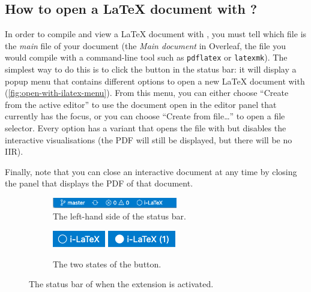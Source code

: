 \subsection{How to open a \LaTeX{} document with \iLaTeX{}?}
In order to compile and view a \LaTeX{} document with \iLaTeX{}, you must tell \iLaTeX{} which file is the \emph{main} file of your document (\ie the \emph{Main document} in Overleaf, the file you would compile with a command-line tool such as \texttt{pdflatex} or \texttt{latexmk}).
The simplest way to do this is to click the \iLaTeX{} button in the status bar: it will display a popup menu that contains different options to open a new \LaTeX{} document with \iLaTeX{} (\autoref{fig:open-with-ilatex-menu}).
From this menu, you can either choose ``Create from the active editor'' to use the document open in the editor panel that currently has the focus, or you can choose ``Create from file\dots'' to open a file selector.
Every option has a variant that opens the file with \iLaTeX{} but disables the interactive visualisations (the PDF will still be displayed, but there will be no IIR).

Finally, note that you can close an interactive document at any time by closing the panel that displays the PDF of that document.

\begin{figure}[h]
    \centering
    \begin{subfigure}[b]{0.6\textwidth}
        \centering
        \includegraphics[width=0.6\textwidth]{img/vsc-status-bar-2.png}
        \caption{The left-hand side of the status bar.}
        \label{subfig:status-bar-with-ilatex-button}
    \end{subfigure}%
    \begin{subfigure}[b]{0.4\textwidth}
        \centering
        \includegraphics[scale = 0.5]{img/ilatex-button-off.png} \qquad
        \includegraphics[scale = 0.5]{img/ilatex-button-on.png}
        \caption{The two states of the \iLaTeX{} button.}
        \label{subfig:status-bar-buttons}
    \end{subfigure}
    \caption{The status bar of \vsc when the \iLaTeX{} extension is activated.}
    \label{fig:status-bar}
\end{figure}

